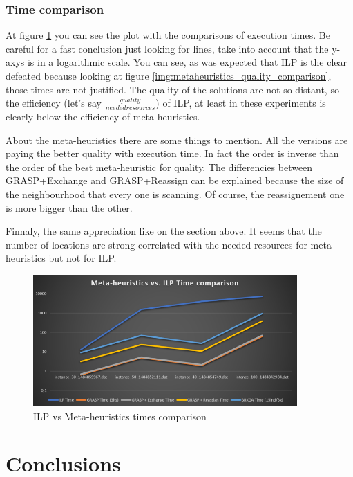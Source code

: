 \documentclass[]{report}
\begin{document}
\subsection{Time comparison}

At figure \ref{img:ilp_metaheuristics_comparison} you can see the plot with the comparisons of execution times. Be careful for a fast conclusion just looking for lines, take into account that the y-axys is in a logarithmic scale. You can see, as was expected that ILP is the clear defeated because looking at figure \ref{img:metaheuristics_quality_comparison}, those times are not justified. The quality of the solutions are not so distant, so the efficiency (let's say $\frac{quality}{needed resources}$) of ILP, at least in these experiments is clearly below the efficiency of meta-heuristics.

About the meta-heuristics there are some things to mention. All the versions are paying the better quality with execution time. In fact the order is inverse than the order of the best meta-heuristic for quality. The differencies between GRASP+Exchange and GRASP+Reassign can be explained because the size of the neighbourhood that every one is scanning. Of course, the reassignement one is more bigger than the other.

Finnaly, the same appreciation like on the section above. It seems that the number of locations are strong correlated with the needed resources for meta-heuristics but not for ILP.

\begin{figure}
	\caption{ILP vs Meta-heuristics times comparison}
	\label{img:ilp_metaheuristics_comparison}
	\centering
	\includegraphics[width=0.9\textwidth]{./imgs/ilp_vs_metaheuristics_time_comparison.png}
\end{figure}

\chapter{Conclusions}\label{ch:conclusions}
\end{document}
